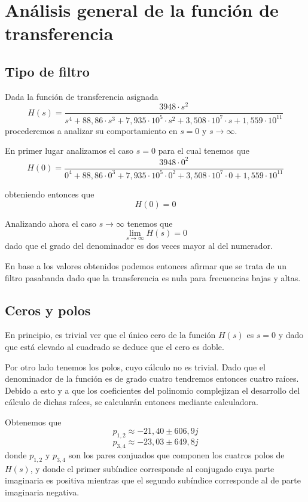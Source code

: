 \documentclass[11pt,a4paper]{report}
\author{Marcos Rolando}
\begin{document}

\section*{Análisis general de la función de transferencia}

\subsection*{Tipo de filtro}

Dada la función de transferencia asignada
\[H(s)=\frac{3948 \cdot s^2}{s^4+88,86 \cdot s^3+7,935 \cdot 10^5 \cdot s^2+3,508 \cdot 10^7 \cdot s+1,559 \cdot 10^{11}}\]
procederemos a analizar su comportamiento en $s=0$ y $s\longrightarrow\infty$.

\bigskip
En primer lugar analizamos el caso $s=0$ para el cual tenemos que 
\[H(0) = \frac{3948 \cdot 0^2}{0^4+88,86 \cdot 0^3+7,935 \cdot 10^5 \cdot 0^2+3,508 \cdot 10^7 \cdot 0+1,559 \cdot 10^{11}}\]

obteniendo entonces que
\[H(0) = 0\]

Analizando ahora el caso $s\longrightarrow\infty$ tenemos que
\[\lim_{s \to \infty} H(s) = 0\]
dado que el grado del denominador es dos veces mayor al del numerador.

\bigskip
En base a los valores obtenidos podemos entonces afirmar que se trata de un
filtro pasabanda dado que la transferencia es nula para frecuencias bajas y altas.

\subsection*{Ceros y polos}

En principio, es trivial ver que el único cero de la función $H(s)$ es
$s = 0$ y dado que está elevado al cuadrado se deduce que el cero es doble.

\bigskip
Por otro lado tenemos los polos, cuyo cálculo no es trivial. Dado que el denominador de la función es de grado cuatro tendremos entonces cuatro raíces. Debido a esto
y a que los coeficientes del polinomio complejizan el desarrollo del cálculo de 
dichas raíces, se calcularán entonces mediante calculadora. 

\bigskip
Obtenemos que
\[p_{1,2} \approx -21,40 \pm 606,9j\]
\[p_{3,4} \approx -23,03 \pm 649,8j\]
donde $p_{1,2}$ y $p_{3,4}$ son los pares conjuados que componen los cuatros
polos de $H(s)$, y donde el primer subíndice corresponde al conjugado cuya parte imaginaria es positiva mientras que el segundo subíndice corresponde al de parte imaginaria negativa.
\end{document}
